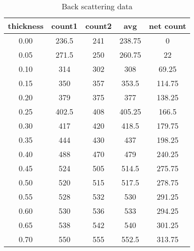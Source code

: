 \begin{table}[H]
    \centering
    \begin{tabular}{|c|c|c|c|c|}
        \hline
        thickness & count1 & count2 & avg    & net count \\ \hline
        0.00      & 236.5  & 241    & 238.75 & 0         \\ \hline
        0.05      & 271.5  & 250    & 260.75 & 22        \\ \hline
        0.10      & 314    & 302    & 308    & 69.25     \\ \hline
        0.15      & 350    & 357    & 353.5  & 114.75    \\ \hline
        0.20      & 379    & 375    & 377    & 138.25    \\ \hline
        0.25      & 402.5  & 408    & 405.25 & 166.5     \\ \hline
        0.30      & 417    & 420    & 418.5  & 179.75    \\ \hline
        0.35      & 444    & 430    & 437    & 198.25    \\ \hline
        0.40      & 488    & 470    & 479    & 240.25    \\ \hline
        0.45      & 524    & 505    & 514.5  & 275.75    \\ \hline
        0.50      & 520    & 515    & 517.5  & 278.75    \\ \hline
        0.55      & 528    & 532    & 530    & 291.25    \\ \hline
        0.60      & 530    & 536    & 533    & 294.25    \\ \hline
        0.65      & 538    & 542    & 540    & 301.25    \\ \hline
        0.70      & 550    & 555    & 552.5  & 313.75    \\ \hline
    \end{tabular}
    \label{tab:4}
    \caption{Back scattering data}
\end{table}